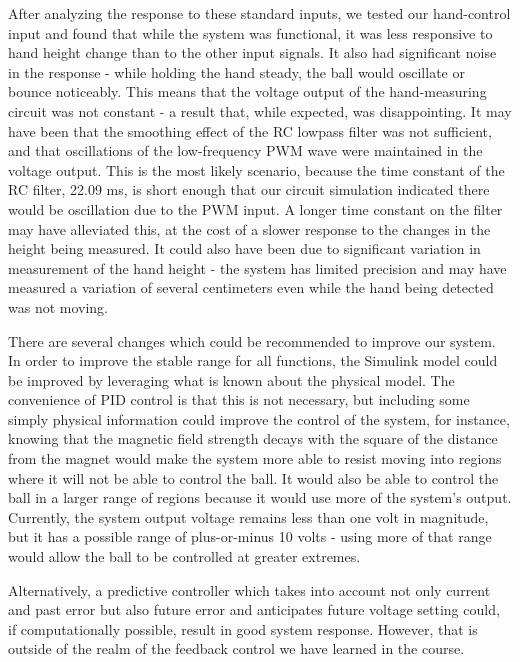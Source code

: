 \documentclass{article}
\begin{document}
After analyzing the response to these standard inputs, we tested our hand-control input and found that while the system was functional, it was less responsive to hand height change than to the other input signals.  It also had significant noise in the response - while holding the hand steady, the ball would oscillate or bounce noticeably.  This means that the voltage output of the hand-measuring circuit was not constant - a result that, while expected, was disappointing.  It may have been that the smoothing effect of the RC lowpass filter was not sufficient, and that oscillations of the low-frequency PWM wave were maintained in the voltage output.  This is the most likely scenario, because the time constant of the RC filter, 22.09 ms, is short enough that our circuit simulation indicated there would be oscillation due to the PWM input.  A longer time constant on the filter may have alleviated this, at the cost of a slower response to the changes in the height being measured.  It could also have been due to significant variation in measurement of the hand height - the system has limited precision and may have measured a variation of several centimeters even while the hand being detected was not moving.  

There are several changes which could be recommended to improve our system.  In order to improve the stable range for all functions, the Simulink model could be improved by leveraging what is known about the physical model.  The convenience of PID control is that this is not necessary, but including some simply physical information could improve the control of the system, for instance, knowing that the magnetic field strength decays with the square of the distance from the magnet would make the system more able to resist moving into regions where it will not be able to control the ball. It would also be able to control the ball in a larger range of regions because it would use more of the system's output.  Currently, the system output voltage remains less than one volt in magnitude, but it has a possible range of plus-or-minus 10 volts - using more of that range would allow the ball to be controlled at greater extremes.

Alternatively, a predictive controller which takes into account not only current and past error but also future error and anticipates future voltage setting could, if computationally possible, result in good system response.  However, that is outside of the realm of the feedback control we have learned in the course.\\
\end{document}
